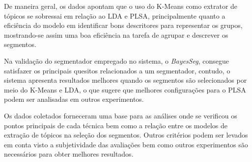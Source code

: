 

De maneira geral, os dados apontam que o uso do K-Means como extrator de tópicos se sobressai em relação ao LDA e PLSA, principalmente quanto a eficiência do modelo em identificar bons descritores para representar os grupos, mostrando-se assim uma boa eficiência na tarefa de agrupar e descrever os segmentos.

Na validação do segmentador empregado no sistema, o \textit{BayesSeg}, consegue satisfazer os principais quesitos relacionados a um segmentador, contudo, o sistema apresenta resultados melhores quando os segmentos são selecionados por meio do K-Means e LDA, o que sugere que melhores configurações para o PLSA podem ser analisadas em outros experimentos.


Os dados coletados forneceram uma base para as análises onde se verificou os pontos principais de cada técnica bem como a relação entre os modelos de extração de tópicos na seleção dos segmentos. Outros critérios podem ser levados em conta visto a subjetividade das avaliações bem como outros experimentos são necessários para obter melhores resultados.

